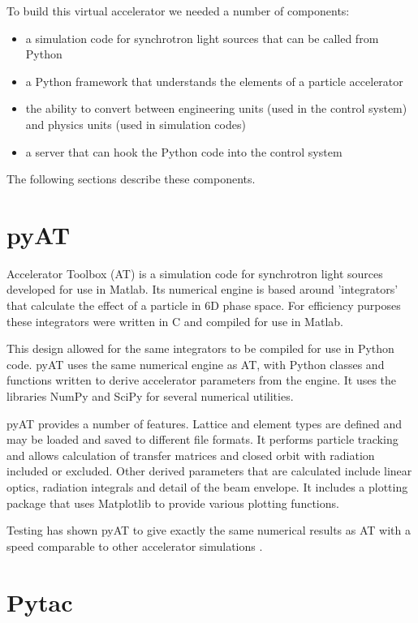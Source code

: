 \documentclass[a4paper,
               keeplastbox,   %
               ]{jacow}
\begin{document}
To build this virtual accelerator we needed a number of components:

\begin{itemize}
    \item a simulation code for synchrotron light sources that can be called from Python
    \item a Python framework that understands the elements of a particle accelerator 
    \item the ability to convert between engineering units (used in the control system) and physics
  units (used in simulation codes)
    \item a server that can hook the Python code into the control system
\end{itemize}

The following sections describe these components.

\section{pyAT}

Accelerator Toolbox (AT) \cite{at} is a simulation code for synchrotron light sources
developed for use in Matlab. Its numerical engine is based around
'integrators' that calculate the effect of a particle in 6D phase space.
For efficiency purposes these integrators were written in C and compiled for
use in Matlab.

This design allowed for the same integrators to be compiled for use in Python
code. pyAT uses the same numerical engine as AT, with Python classes and functions
written to derive accelerator parameters from the engine. It uses the libraries
NumPy and SciPy for several numerical utilities.

pyAT provides a number of features. Lattice and element types are defined and may
be loaded and saved to different file formats. It performs particle tracking and 
allows calculation of transfer matrices and closed orbit with radiation included
or excluded. Other derived parameters that are calculated include linear optics,
radiation integrals and detail of the beam envelope. It includes a plotting package
that uses Matplotlib to provide various plotting functions.

Testing has shown pyAT to give exactly the same numerical results as AT with 
a speed comparable to other accelerator simulations \cite{pyat}.

\section{Pytac}
\end{document}
